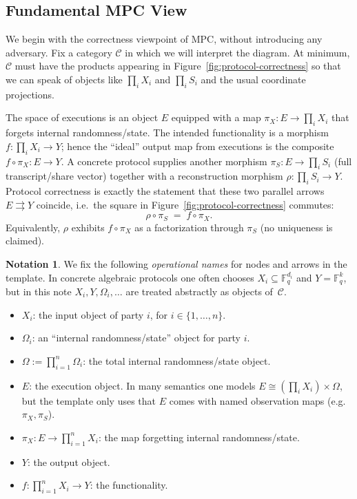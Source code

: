 \documentclass[11pt,a4paper]{article}
\theoremstyle{definition}
\newtheorem{notation}[definition]{Notation}
\theoremstyle{plain}
\newcommand{\F}{\mathbb{F}}
\begin{document}
\subsection{Fundamental MPC View}

We begin with the correctness viewpoint of MPC, without introducing any adversary.
Fix a category $\mathcal{C}$ in which we will interpret the diagram.
At minimum, $\mathcal{C}$ must have the products appearing in Figure~\ref{fig:protocol-correctness} so that we can speak of objects like $\prod_i X_i$ and $\prod_i S_i$ and the usual coordinate projections.

The space of executions is an object $E$ equipped with a map $\pi_X:E\to \prod_i X_i$ that forgets internal randomness/state.
The intended functionality is a morphism $f:\prod_i X_i\to Y$; hence the ``ideal'' output map from executions is the composite $f\circ \pi_X:E\to Y$.
A concrete protocol supplies another morphism $\pi_S:E\to \prod_i S_i$ (full transcript/share vector) together with a reconstruction morphism $\rho:\prod_i S_i\to Y$.
Protocol correctness is exactly the statement that these two parallel arrows $E\rightrightarrows Y$ coincide, i.e.\ the square in Figure~\ref{fig:protocol-correctness} commutes:
\[
\rho\circ \pi_S \;=\; f\circ \pi_X.
\]
Equivalently, $\rho$ exhibits $f\circ \pi_X$ as a factorization through $\pi_S$ (no uniqueness is claimed).

\begin{notation}
We fix the following \emph{operational names} for nodes and arrows in the template.
In concrete algebraic protocols one often chooses $X_i\subseteq \F_q^{d_i}$ and $Y=\F_q^k$, but in this note $X_i,Y,\Omega_i,\dots$ are treated abstractly as objects of~$\mathcal{C}$.
\begin{itemize}
    \item $X_i$: the input object of party $i$, for $i \in \{1, \ldots, n\}$.
    \item $\Omega_i$: an ``internal randomness/state'' object for party $i$.
    \item $\Omega := \prod_{i=1}^n \Omega_i$: the total internal randomness/state object.
    \item $E$: the execution object. In many semantics one models $E\cong (\prod_i X_i)\times \Omega$, but the template only uses that $E$ comes with named observation maps (e.g.\ $\pi_X,\pi_S$).
    \item $\pi_X: E \to \prod_{i=1}^n X_i$: the map forgetting internal randomness/state.
    \item $Y$: the output object.
    \item $f: \prod_{i=1}^n X_i \to Y$: the functionality.
\end{itemize}
\end{notation}
\end{document}
